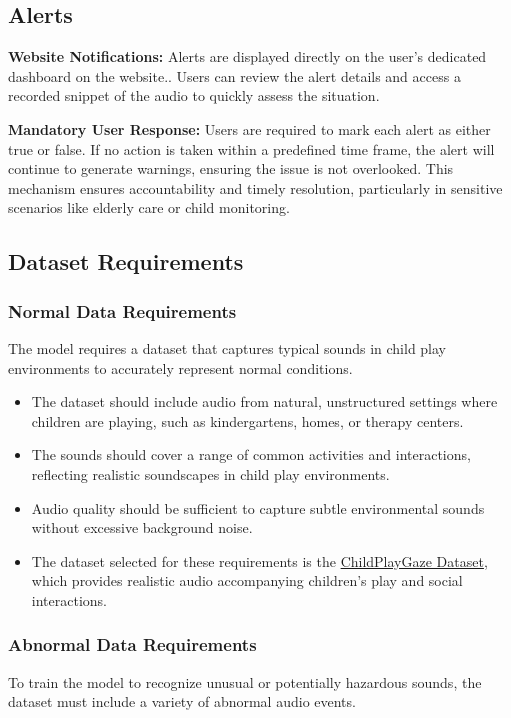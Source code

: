 \documentclass[conference]{IEEEtran}
\begin{document}
\subsection{Alerts}

\textbf{Website Notifications:} Alerts are displayed directly on the user’s dedicated dashboard on the website.. Users can review the alert details and access a recorded snippet of the audio to quickly assess the situation.

\textbf{Mandatory User Response:} Users are required to mark each alert as either true or false. If no action is taken within a predefined time frame, the alert will continue to generate warnings, ensuring the issue is not overlooked. This mechanism ensures accountability and timely resolution, particularly in sensitive scenarios like elderly care or child monitoring.


\subsection{Dataset Requirements}
\subsubsection{Normal Data Requirements}
The model requires a dataset that captures typical sounds in child play environments to accurately represent normal conditions.

\begin{itemize}
    \item The dataset should include audio from natural, unstructured settings where children are playing, such as kindergartens, homes, or therapy centers.
    \item The sounds should cover a range of common activities and interactions, reflecting realistic soundscapes in child play environments.
    \item Audio quality should be sufficient to capture subtle environmental sounds without excessive background noise.
    \item The dataset selected for these requirements is the \href{https://www.idiap.ch/en/dataset/childplay-gaze}{ChildPlayGaze Dataset}, which provides realistic audio accompanying children’s play and social interactions.
\end{itemize}

\subsubsection{Abnormal Data Requirements}
To train the model to recognize unusual or potentially hazardous sounds, the dataset must include a variety of abnormal audio events.
\end{document}
